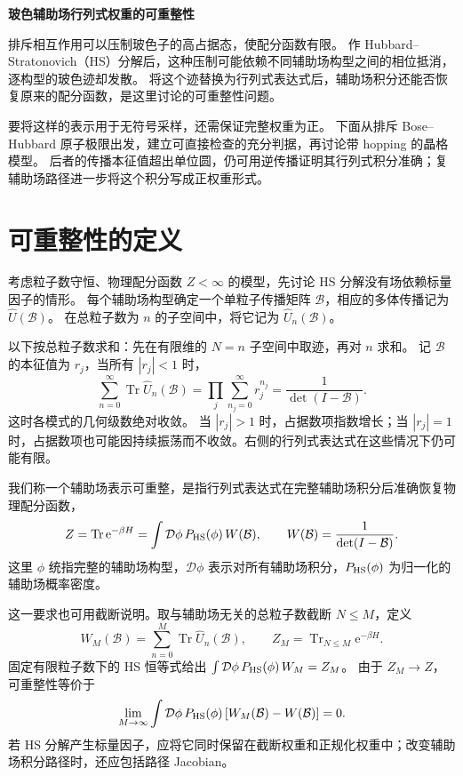 \documentclass[UTF8,11pt,a4paper,fontset=fandol]{ctexart}
\newcommand{\Tr}{\operatorname{Tr}}
\newcommand{\ee}{\mathrm e}
\numberwithin{equation}{section}
\begin{document}
\begin{center}
{\Large\bfseries 玻色辅助场行列式权重的可重整性}\par
\end{center}
\vspace{3pt}

排斥相互作用可以压制玻色子的高占据态，使配分函数有限。
作 Hubbard--Stratonovich（HS）分解后，这种压制可能依赖不同辅助场构型之间的相位抵消，逐构型的玻色迹却发散。
将这个迹替换为行列式表达式后，辅助场积分还能否恢复原来的配分函数，是这里讨论的可重整性问题。

要将这样的表示用于无符号采样，还需保证完整权重为正。
下面从排斥 Bose--Hubbard 原子极限出发，建立可直接检查的充分判据，再讨论带 hopping 的晶格模型。
后者的传播本征值超出单位圆，仍可用逆传播证明其行列式积分准确；复辅助场路径进一步将这个积分写成正权重形式。

\section{可重整性的定义}

考虑粒子数守恒、物理配分函数 $Z<\infty$ 的模型，先讨论 HS 分解没有场依赖标量因子的情形。
每个辅助场构型确定一个单粒子传播矩阵 $\mathcal B$，相应的多体传播记为 $\hat U(\mathcal B)$。
在总粒子数为 $n$ 的子空间中，将它记为 $\hat U_n(\mathcal B)$。

以下按总粒子数求和：先在有限维的 $N=n$ 子空间中取迹，再对 $n$ 求和。
记 $\mathcal B$ 的本征值为 $r_j$，当所有 $|r_j|<1$ 时，
\begin{equation}
 \sum_{n=0}^{\infty}\Tr\hat U_n(\mathcal B)
 =\prod_j\sum_{n_j=0}^{\infty}r_j^{n_j}
 =\frac1{\det(I-\mathcal B)}.
\end{equation}
这时各模式的几何级数绝对收敛。
当 $|r_j|>1$ 时，占据数项指数增长；当 $|r_j|=1$ 时，占据数项也可能因持续振荡而不收敛。右侧的行列式表达式在这些情况下仍可能有限。

我们称一个辅助场表示可重整，是指行列式表达式在完整辅助场积分后准确恢复物理配分函数，
\begin{equation}
 Z=\Tr\ee^{-\beta H}
 =\int\mathcal D\phi\,P_{\rm HS}(\phi)\,W(\mathcal B),\qquad W(\mathcal B)=\frac1{\det(I-\mathcal B)}.
 \label{eq:goal}
\end{equation}
这里 $\phi$ 统指完整的辅助场构型，$\mathcal D\phi$ 表示对所有辅助场积分，$P_{\rm HS}(\phi)$ 为归一化的辅助场概率密度。

这一要求也可用截断说明。取与辅助场无关的总粒子数截断 $N\le M$，定义
\begin{equation}
 W_M(\mathcal B)=\sum_{n=0}^{M}\Tr\hat U_n(\mathcal B),\qquad
 Z_M=\Tr_{N\le M}\ee^{-\beta H}.
\end{equation}
固定有限粒子数下的 HS 恒等式给出 $\int\mathcal D\phi\,P_{\rm HS}(\phi)\,W_M=Z_M$。
由于 $Z_M\to Z$，可重整性等价于
\begin{equation}
 \lim_{M\to\infty}\int\mathcal D\phi\,P_{\rm HS}(\phi)\,[W_M(\mathcal B)-W(\mathcal B)]=0.
 \label{eq:remainder}
\end{equation}
若 HS 分解产生标量因子，应将它同时保留在截断权重和正规化权重中；改变辅助场积分路径时，还应包括路径 Jacobian。
\end{document}
